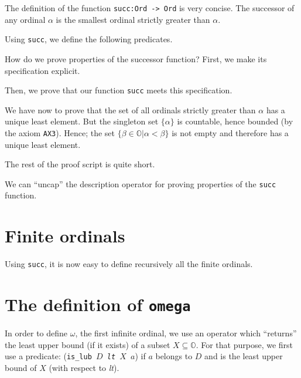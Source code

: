 The definition of the function \texttt{succ:Ord -> Ord} is very concise. The successor of any ordinal $\alpha$ is the smallest ordinal strictly greater than $\alpha$.

\label{Functions:succ-sch}



Using \texttt{succ}, we define the following predicates.







How do we prove properties of the successor function?
First, we make its specification explicit.



Then, we prove that our function \texttt{succ} meets this specification. 




We have now to prove that the set of all ordinals strictly greater than $\alpha$ has a unique least element. But the singleton set $\{\alpha\}$ is countable, hence  bounded (by the axiom \texttt{AX3}). Hence; the set $\{\beta\in\mathbb{O}|\alpha < \beta\}$ is not empty
and therefore has a unique least element.

The rest of the \coq{} proof script is quite short.



We can ``uncap'' the description operator for proving properties of the
\texttt{succ} function.





\section{Finite ordinals}

Using \texttt{succ}, it is now easy to define recursively all the finite ordinals.

\label{sect:notation-F-sch}



\section{The definition of \texttt{omega}}
In order to define $\omega$, the first infinite ordinal, we use an operator which
``returns'' the least upper bound (if it exists) of a subset $X\subseteq \mathbb{O}$.
For that purpose, we first use a predicate:
(\texttt{is\_lub $D$ \textit{lt} $X$ $a$}) if $a$ belongs to $D$ and is the least 
upper bound  of $X$ (with respect to \textit{lt}).


